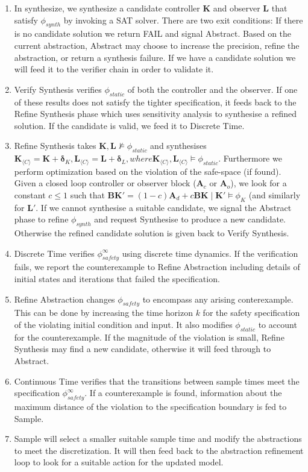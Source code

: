 \documentclass[sigconf]{llncs}
\newcommand{\mat}[1]{\boldsymbol{#1}}
\begin{document}
\begin{enumerate}
\item In {\sc synthesize}, we synthesize a candidate controller $\mat{K}$
and observer $\mat{L}$ that satisfy
$\phi_{synth}$ by invoking a SAT solver.
There are two exit conditions:
If there is no candidate solution we return FAIL and signal {\sc Abstract}. Based on the current abstraction,
{\sc  Abstract} may choose to increase the precision, refine the abstraction, or return a synthesis failure.
If we have a candidate solution we will feed it to the verifier chain in order to validate it.
%
\item {\sc Verify Synthesis} verifies $\phi_{static}$ of  both the
controller and the observer.  If one of these results does not satisfy the tighter
specification, it feeds back to the {\sc Refine Synthesis} phase which uses sensitivity analysis to
synthesise a refined solution. If the candidate is valid, we feed it to {\sc Discrete Time}. 
\item {\sc Refine Synthesis} takes $\mat{K},\mat{L} \not \models \phi_{static}$ and synthesises $\mat{K}_{\langle C \rangle} = \mat{K}+\mat{\delta}_K, \mat{L}_{\langle C \rangle}=\mat{L}+\mat{\delta}_L, where \mat{K}_{\langle C \rangle}, \mat{L}_{\langle C \rangle} \models \phi_{static}$.
Furthermore we perform optimization based on the violation of the safe-space (if found).
Given a closed loop controller or observer block ($\mat{A}_c$ or $\mat{A}_o$),
we look for a constant $c \leq 1$ such that $\mat{B}\mat{K}'=(1-c)\mat{A}_d+c\mat{B}\mat{K} \mid \mat{K}' \models \phi_K$
(and similarly for $\mat{L}'$.
If we cannot synthesise a suitable candidate, we signal the {\sc Abstract} phase to refine $\phi_{synth}$ and request {\sc Synthesise} to produce a new candidate. Otherwise the refined candidate solution is given back to {\sc Verify Synthesis}.
%
\item {\sc Discrete Time} verifies $\phi_{safety}^{\infty}$ using discrete
time dynamics.  If the verification fails, we report the counterexample to
{\sc Refine Abstraction} including details of initial states and
iterations that failed the specification.  
\item {\sc Refine Abstraction} changes $\phi_{safety}$ to encompass any arising conterexample. 
This can be done by increasing the time horizon $k$ for the safety specification of the violating initial condition and input.
It also modifies $\phi_{static}$ to account for the counterexample.
If the magnitude of the violation is small, {\sc Refine Synthesis} may find a new candidate, otherwise it will feed through to {\sc Abstract}.
%
\item {\sc Continuous Time} verifies that the
transitions between sample times meet the specification $\phi_{safety}^{\infty}$.  If
a counterexample is found, information about the maximum distance of the
violation to the specification boundary is fed to {\sc Sample}. 
\item {\sc Sample} will select a smaller suitable sample time and modify the abstractions to meet the discretization. 
It will then feed back to the abstraction refinement loop to look for a suitable action for the updated model.
%


\end{enumerate}
\end{document}
